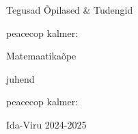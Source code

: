 \begin{titlepage}
\par{Tegusad Õpilased \& Tudengid}
\vspace{0.3\textheight}
\par{peacecop kalmer:}
\LARGE
\par{Matemaatikaõpe}
\normalsize
\par{juhend}
\vspace{0.3\textheight}
\begin{flushright}
\par{peacecop kalmer:}
\end{flushright}
\vfill
Ida-Viru
\hfill
2024-2025
\end{titlepage}
